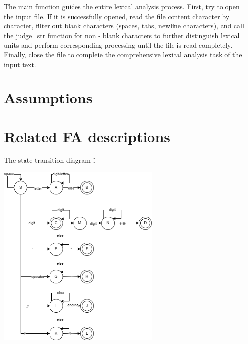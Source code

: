 \documentclass[a4paper,12pt]{article}
\begin{document}
The main function guides the entire lexical analysis process. First, try to open the input file. If it is successfully opened, read the file content character by character, filter out blank characters (spaces, tabs, newline characters), and call the judge\_str function for non - blank characters to further distinguish lexical units and perform corresponding processing until the file is read completely. Finally, close the file to complete the comprehensive lexical analysis task of the input text.

\section{Assumptions}



\section{Related FA descriptions}
The state transition diagram：

\vspace{10pt}
\centerline{\includegraphics[width=0.6\textwidth]{photo/1.png}}
\vspace{10pt}
\end{document}
